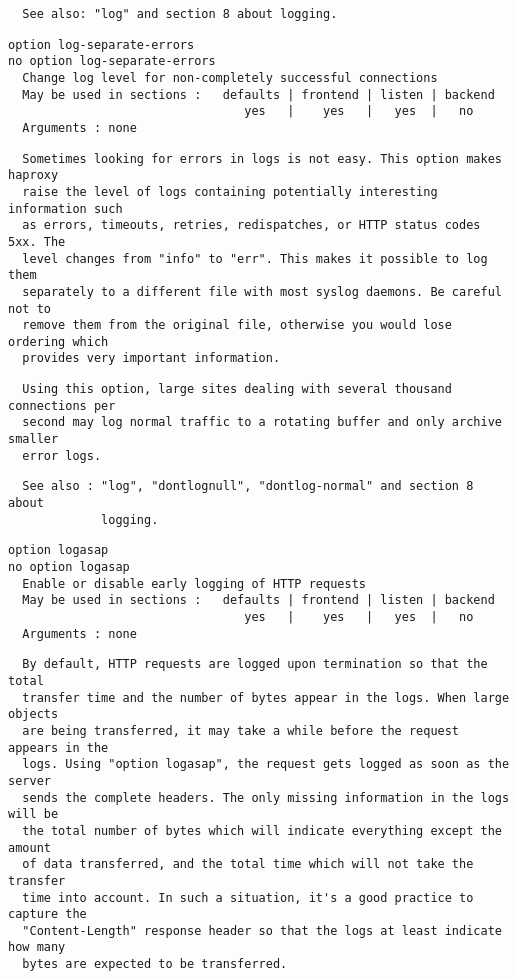 \begin{verbatim}
  See also: "log" and section 8 about logging.
\end{verbatim}

\begin{verbatim}
option log-separate-errors
no option log-separate-errors
  Change log level for non-completely successful connections
  May be used in sections :   defaults | frontend | listen | backend
                                 yes   |    yes   |   yes  |   no
  Arguments : none
\end{verbatim}

\begin{verbatim}
  Sometimes looking for errors in logs is not easy. This option makes haproxy
  raise the level of logs containing potentially interesting information such
  as errors, timeouts, retries, redispatches, or HTTP status codes 5xx. The
  level changes from "info" to "err". This makes it possible to log them
  separately to a different file with most syslog daemons. Be careful not to
  remove them from the original file, otherwise you would lose ordering which
  provides very important information.
\end{verbatim}

\begin{verbatim}
  Using this option, large sites dealing with several thousand connections per
  second may log normal traffic to a rotating buffer and only archive smaller
  error logs.
\end{verbatim}

\begin{verbatim}
  See also : "log", "dontlognull", "dontlog-normal" and section 8 about
             logging.
\end{verbatim}

\begin{verbatim}
option logasap
no option logasap
  Enable or disable early logging of HTTP requests
  May be used in sections :   defaults | frontend | listen | backend
                                 yes   |    yes   |   yes  |   no
  Arguments : none
\end{verbatim}

\begin{verbatim}
  By default, HTTP requests are logged upon termination so that the total
  transfer time and the number of bytes appear in the logs. When large objects
  are being transferred, it may take a while before the request appears in the
  logs. Using "option logasap", the request gets logged as soon as the server
  sends the complete headers. The only missing information in the logs will be
  the total number of bytes which will indicate everything except the amount
  of data transferred, and the total time which will not take the transfer
  time into account. In such a situation, it's a good practice to capture the
  "Content-Length" response header so that the logs at least indicate how many
  bytes are expected to be transferred.
\end{verbatim}

